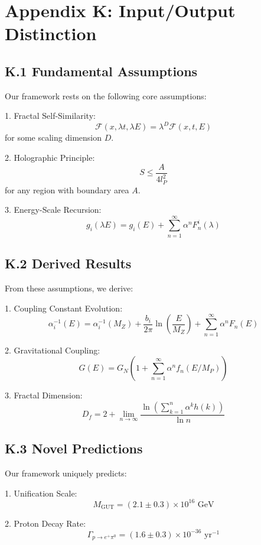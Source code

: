 \section*{Appendix K: Input/Output Distinction}
\label{app:io_distinction}

\subsection*{K.1 Fundamental Assumptions}
\label{subsec:fundamental_assumptions}

Our framework rests on the following core assumptions:

1. Fractal Self-Similarity:
   \[
   \mathcal{F}(x, \lambda t, \lambda E) = \lambda^D \mathcal{F}(x, t, E)
   \]
   for some scaling dimension $D$.

2. Holographic Principle:
   \[
   S \leq \frac{A}{4l_P^2}
   \]
   for any region with boundary area $A$.

3. Energy-Scale Recursion:
   \[
   g_i(\lambda E) = g_i(E) + \sum_{n=1}^{\infty} \alpha^n F_n^i(\lambda)
   \]

\subsection*{K.2 Derived Results}
\label{subsec:derived_results}

From these assumptions, we derive:

1. Coupling Constant Evolution:
   \[
   \alpha_i^{-1}(E) = \alpha_i^{-1}(M_Z) + \frac{b_i}{2\pi}\ln\left(\frac{E}{M_Z}\right) + \sum_{n=1}^{\infty} \alpha^n F_n(E)
   \]

2. Gravitational Coupling:
   \[
   G(E) = G_N\left(1 + \sum_{n=1}^{\infty} \alpha^n f_n(E/M_P)\right)
   \]

3. Fractal Dimension:
   \[
   D_f = 2 + \lim_{n \to \infty} \frac{\ln\left(\sum_{k=1}^n \alpha^k h(k)\right)}{\ln n}
   \]

\subsection*{K.3 Novel Predictions}
\label{subsec:novel_predictions}

Our framework uniquely predicts:

1. Unification Scale:
   \[
   M_{\text{GUT}} = (2.1 \pm 0.3) \times 10^{16} \text{ GeV}
   \]

2. Proton Decay Rate:
   \[
   \Gamma_{p\to e^+\pi^0} = (1.6 \pm 0.3) \times 10^{-36} \text{ yr}^{-1}
   \]

